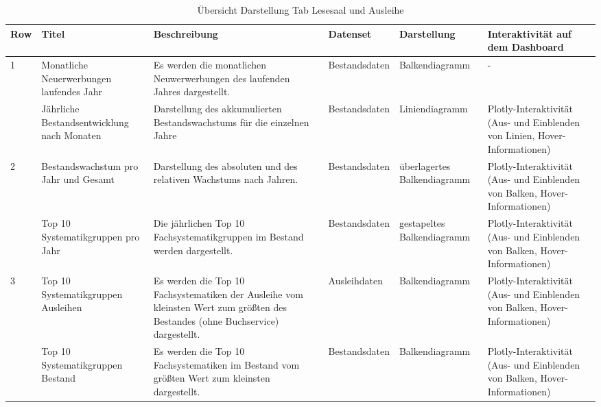     \begingroup
    \setlength{\tabcolsep}{12pt} %
    \begin{table}[h]
        \LARGE
        \centering
        \begin{adjustbox}{max width=\textwidth}
        \begin{tabular}{p{}p{}p{}p{}p{}p{}}
           \toprule
           Row        &Titel &Beschreibung &Datenset &Darstellung &Interaktivität auf dem Dashboard\\
           \midrule
            1           &Monatliche Neuerwerbungen laufendes Jahr&Es werden die monatlichen Neuwerwerbungen des laufenden Jahres dargestellt.&Bestandsdaten&Balkendiagramm&-\\
                        &Jährliche Bestandsentwicklung nach Monaten&Darstellung des akkumulierten Bestandswachstums für die einzelnen Jahre&Bestandsdaten&Liniendiagramm    &Plotly-Interaktivität (Aus- und Einblenden von Linien, Hover-Informationen)\\          
            \midrule
            2           &Bestandswachstum pro Jahr und Gesamt&Darstellung des absoluten und des relativen Wachstums nach Jahren.&Bestandsdaten&überlagertes Balkendiagramm&Plotly-Interaktivität (Aus- und Einblenden von Balken, Hover-Informationen)\\
                        &Top 10 Systematikgruppen pro Jahr&Die jährlichen Top 10 Fachsystematikgruppen im Bestand werden dargestellt.&Bestandsdaten    &gestapeltes Balkendiagramm&Plotly-Interaktivität (Aus- und Einblenden von Balken, Hover-Informationen)\\
            \midrule
            3           &Top 10 Systematikgruppen Ausleihen&Es werden die Top 10 Fachsystematiken der Ausleihe vom kleinsten Wert zum größten des Bestandes (ohne Buchservice) dargestellt.&Ausleihdaten&Balkendiagramm&Plotly-Interaktivität (Aus- und Einblenden von Balken, Hover-Informationen)\\
                        &Top 10 Systematikgruppen Bestand&Es werden die Top 10 Fachsystematiken im Bestand vom größten Wert zum kleinsten dargestellt.&Bestandsdaten&Balkendiagramm&Plotly-Interaktivität (Aus- und Einblenden von Balken, Hover-Informationen)\\

        \bottomrule
        \end{tabular}
        \end{adjustbox}
        \caption{%
            Übersicht Darstellung Tab Lesesaal und Ausleihe
        }
        \label{tab:Darstellung Tab Lesesaal und Ausleihe}
        \end{table}
    \endgroup

